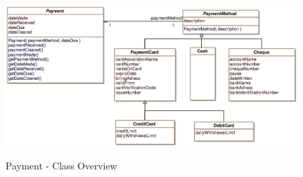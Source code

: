 \begin{figure}
\centering
  \includegraphics[width=1.0\textwidth]{images/Payment_Overview.eps}
	\label{payment_overview}
	\caption{Payment - Class Overview}
\end{figure}
